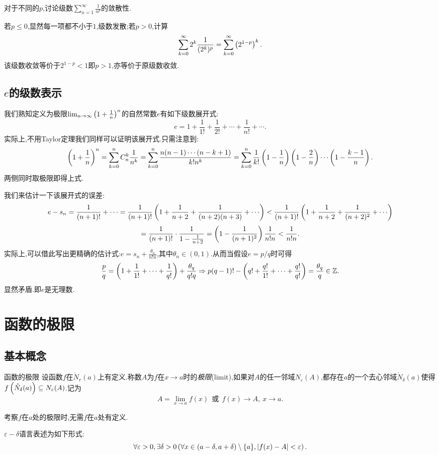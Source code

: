 \begin{example}
	对于不同的$p$,讨论级数$\sum_{n=1}^{\infty} \frac{1}{n^p}$的敛散性.
\end{example}
\begin{solution}
	若$p\leq 0$,显然每一项都不小于$1$,级数发散;若$p>0$,计算$$\sum_{k=0}^{\infty} 2^k \frac{1}{(2^k)^p} = \sum_{k=0}^{\infty} \left( 2^{1-p} \right)^k.$$
	该级数收敛等价于$2^{1-p}<1$即$p>1$,亦等价于原级数收敛.
\end{solution}

\subsection{$e$的级数表示}

我们熟知定义为极限$\lim_{n\to \infty} \left( 1+\frac{1}{n} \right)^n$的自然常数$e$有如下级数展开式:$$e=1+\frac{1}{1!}+\frac{1}{2!} + \cdots + \frac{1}{n!} + \cdots .$$
实际上,不用Taylor定理我们同样可以证明该展开式.只需注意到:
$$\left( 1+\frac{1}{n} \right)^n = \sum_{k=0}^{n} C_n^k \frac{1}{n^k} = \sum_{k=0}^{n} \frac{n(n-1)\cdots (n-k+1)}{k!n^k} = \sum_{k=0}^{n} \frac{1}{k!} \left( 1-\frac{1}{n} \right) \left( 1-\frac{2}{n} \right) \cdots \left( 1-\frac{k-1}{n} \right).$$
两侧同时取极限即得上式.

我们来估计一下该展开式的误差:
$$e-s_n = \frac{1}{(n+1)!} + \cdots = \frac{1}{(n+1)!} \ssb{1+\frac{1}{n+2} + \frac{1}{(n+2)(n+3)} + \cdots} < \frac{1}{(n+1)!} \ssb{ 1+\frac{1}{n+2}+\frac{1}{(n+2)^2}+\cdots }$$
$$= \frac{1}{(n+1)!} \cdot \frac{1}{1-\frac{1}{n+2}} = \left( 1-\frac{1}{(n+1)^2} \right) \frac{1}{n!n} < \frac{1}{n!n}.$$
实际上,可以借此写出更精确的估计式:$e=s_n+\frac{\theta _n}{n!n}$,其中$\theta _n \in (0,1)$.从而当假设$e=p/q$时可得$$\frac{p}{q} = \left( 1+\frac{1}{1!} + \cdots + \frac{1}{q!} \right) + \frac{\theta _q}{q!q} \Rightarrow p(q-1)!-\left( q!+\frac{q!}{1!} + \cdots + \frac{q!}{q!} \right) = \frac{\theta _q}{q} \in \mathbb{Z}.$$
显然矛盾.即$e$是无理数.

\newpage
\section{函数的极限}

\subsection{基本概念}

\begin{definition}{函数的极限}
	设函数$f$在$\mathring{N}_{r}(a)$上有定义.称数$A$为$f$在$x\to a$时的\textit{极限}(limit),如果对$A$的任一邻域$N_{\varepsilon}(A)$,都存在$a$的一个去心邻域$\mathring{N}_{\delta}(a)$使得$f\left( \mathring{N}_{\delta}(a) \right) \subseteq N_{\varepsilon}(A)$.记为$$A = \lim_{x \to a} f(x) ~~ \text{或} ~~ f(x) \to A,~x \to a.$$
\end{definition}
\begin{remark}
	考察$f$在$a$处的极限时,无需$f$在$a$处有定义.
\end{remark}
\begin{remark}
	$\varepsilon - \delta$语言表述为如下形式:$$\forall \varepsilon >0, \exists \delta >0 \left( \forall x \in (a-\delta ,a+\delta) \setminus \{ a\},|f(x)-A|<\varepsilon \right).$$
\end{remark}

